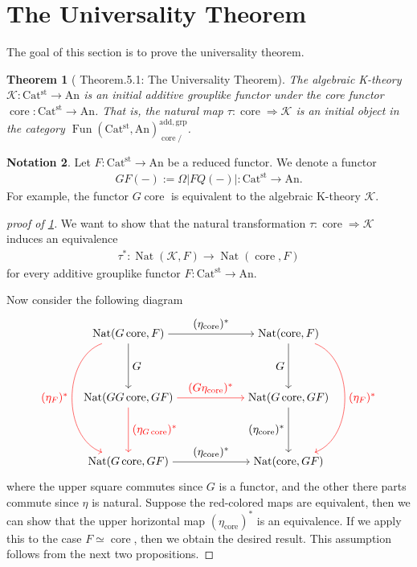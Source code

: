 \documentclass[a4paper,dvipdfmx,11pt,reqno]{amsart}
\DeclareMathOperator{\Nat}{Nat}
\DeclareMathOperator{\Fun}{Fun}
\newcommand{\K}{\mathcal{K}}
\DeclareMathOperator{\core}{core}
\newcommand{\An}{\mathrm{An}}
\newcommand{\Catst}{\mathrm{Cat^{st}}}
\newtheorem{theorem}{Theorem}[section]
\theoremstyle{definition}
\newtheorem{notation}[theorem]{Notation}
\begin{document}
\section{The Universality Theorem}

The goal of this section is to prove the universality theorem.

\begin{theorem}[\cite{HLS23} Theorem.5.1: The Universality Theorem] \label{thrm.universality_theorem}
  The algebraic K-theory $\K : \Catst \to \An$ is an initial additive grouplike functor under the core functor $\core : \Catst \to \An$.
  That is, the natural map $\tau : \core \Rightarrow \K$ is an initial object in the category $\Fun(\Catst,\An)^{\mathrm{add,grp}}_{\core/}$.
\end{theorem}

\begin{notation}
  Let $F : \Catst \to \An$ be a reduced functor.
  We denote a functor 
  \begin{align*}
    GF(-) := \Omega|FQ(-)| : \Catst \to \An. 
  \end{align*}
  For example, the functor $G\core$ is equivalent to the algebraic K-theory $\K$.
\end{notation}

\begin{proof}[proof of \cref{thrm.universality_theorem}]
  We want to show that the natural transformation $\tau : \core \Rightarrow \K$ induces an equivalence
  \begin{align*}
    \tau^{\ast} : \Nat(\K,F) \to \Nat(\core,F)
  \end{align*}
  for every additive grouplike functor $F : \Catst \to \An$.
  
  Now consider the following diagram 
  \[\begin{tikzpicture}[auto,->]
    \node (tl) at (0,4) {$\Nat(G\core,F)$};
    \node (tr) at (5,4) {$\Nat(\core,F)$};
    \node (ml) at (0,2) {$\Nat(GG\core,GF)$};
    \node (mr) at (5,2) {$\Nat(G\core,GF)$};
    \node (bl) at (0,0) {$\Nat(G\core,GF)$};
    \node (br) at (5,0) {$\Nat(\core,GF)$};
    \draw (tl) -- node {$(\eta_{\core})^\ast$} (tr);
    \draw[red] (ml) -- node {$(G\eta_{\core})^\ast$} (mr);
    \draw (bl) -- node {$(\eta_{\core})^\ast$} (br);
    \draw (tl) -- node {$G$} (ml);
    \draw[red] (ml) -- node {$(\eta_{G\core})^\ast$} (bl);
    \draw (tr) -- node[swap] {$G$} (mr);
    \draw (mr) -- node[swap] {$(\eta_{\core})^\ast$} (br); 
    \draw[bend right=70,red] (tl) to node[swap] {$(\eta_{F})^\ast$} (bl);
    \draw[bend left=70,red] (tr) to node {$(\eta_{F})^\ast$} (br);
  \end{tikzpicture}\]
  where the upper square commutes since $G$ is a functor, and the other there parts commute since $\eta$ is natural.
  Suppose the red-colored maps are equivalent, then we can show that the upper horizontal map $(\eta_{\core})^\ast$ is an equivalence.
  If we apply this to the case $F \simeq \core$, then we obtain the desired result.
  This assumption follows from the next two propositions.
\end{proof}
\end{document}
